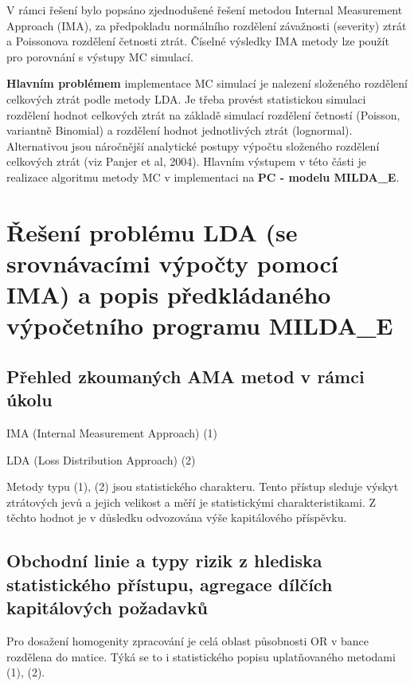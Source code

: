 \documentclass{article}
\begin{document}
V rámci řešení bylo popsáno zjednodušené řešení metodou Internal Measurement Approach (IMA), za předpokladu normálního rozdělení závažnosti (severity) ztrát  a Poissonova rozdělení četnosti ztrát. Číselné výsledky IMA metody lze použít pro porovnání s výstupy MC simulací.


\textbf{Hlavním problémem} implementace MC simulací je nalezení složeného rozdělení celkových ztrát podle metody LDA. Je třeba provést statistickou simulaci rozdělení hodnot celkových ztrát na základě simulací rozdělení četností (Poisson, variantně Binomial) a rozdělení hodnot jednotlivých ztrát (lognormal). Alternativou jsou náročnější analytické postupy výpočtu složeného rozdělení celkových ztrát (viz Panjer et al, 2004).
Hlavním výstupem v této části je realizace algoritmu metody MC v implementaci na \textbf{PC - modelu MILDA\_E}.



\section{Řešení problému LDA (se srovnávacími výpočty pomocí IMA) a popis předkládaného výpočetního programu MILDA\_E}

\subsection{Přehled zkoumaných AMA metod v rámci úkolu}

\begin{compactitem}
\item IMA (Internal Measurement Approach)				(1)
\item LDA (Loss Distribution Approach)				(2)
\end{compactitem}

Metody typu (1), (2) jsou statistického charakteru. Tento přístup sleduje výskyt ztrátových jevů a jejich velikost a měří je statistickými charakteristikami. Z těchto hodnot je v důsledku odvozována výše kapitálového příspěvku.


\subsection{Obchodní linie a typy rizik z hlediska statistického přístupu, agregace dílčích kapitálových požadavků}

Pro dosažení homogenity zpracování je celá oblast působnosti OR v bance rozdělena do matice. Týká se to i statistického popisu uplatňovaného metodami (1), (2).
\end{document}
